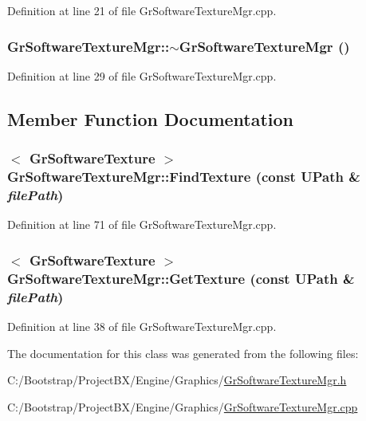 Definition at line 21 of file GrSoftwareTextureMgr.cpp.\hypertarget{class_gr_software_texture_mgr_94d881ba907e54e28c91320965ff8f44}{
\subsubsection[{$\sim$GrSoftwareTextureMgr}]{\setlength{\rightskip}{0pt plus 5cm}GrSoftwareTextureMgr::$\sim$GrSoftwareTextureMgr ()}}
\label{class_gr_software_texture_mgr_94d881ba907e54e28c91320965ff8f44}




Definition at line 29 of file GrSoftwareTextureMgr.cpp.

\subsection{Member Function Documentation}
\hypertarget{class_gr_software_texture_mgr_614dea92c48b69489613a175d1a1b20b}{
\subsubsection[{FindTexture}]{$<$ {\bf GrSoftwareTexture} $>$ GrSoftwareTextureMgr::FindTexture (const {\bf UPath} \& {\em filePath})}}
\label{class_gr_software_texture_mgr_614dea92c48b69489613a175d1a1b20b}




Definition at line 71 of file GrSoftwareTextureMgr.cpp.\hypertarget{class_gr_software_texture_mgr_744b2d59b107ae78eae8e4bfa383c6f7}{
\subsubsection[{GetTexture}]{$<$ {\bf GrSoftwareTexture} $>$ GrSoftwareTextureMgr::GetTexture (const {\bf UPath} \& {\em filePath})}}
\label{class_gr_software_texture_mgr_744b2d59b107ae78eae8e4bfa383c6f7}




Definition at line 38 of file GrSoftwareTextureMgr.cpp.

The documentation for this class was generated from the following files:\begin{CompactItemize}
\item 
C:/Bootstrap/ProjectBX/Engine/Graphics/\hyperlink{_gr_software_texture_mgr_8h}{GrSoftwareTextureMgr.h}\item 
C:/Bootstrap/ProjectBX/Engine/Graphics/\hyperlink{_gr_software_texture_mgr_8cpp}{GrSoftwareTextureMgr.cpp}\end{CompactItemize}
